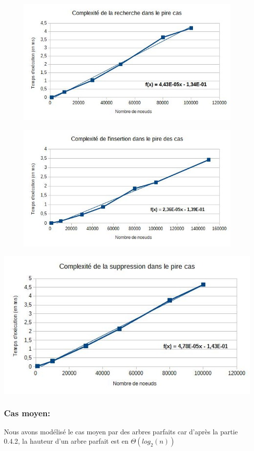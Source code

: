 \documentclass{report}
\begin{document}
\begin{figure}[h]
\includegraphics[scale=0.65]{images/rech.jpg}
\end{figure}
\begin{figure}[h]
\includegraphics[scale=0.65]{images/ins.jpg}
\end{figure}
\includegraphics[scale=0.65]{images/supp.jpg}



\subsubsection{Cas moyen:}
Nous avons modélisé le cas moyen par des arbres parfaits car d'après la partie 0.4.2, la hauteur d'un arbre parfait est en $\Theta(log_2(n))$ 
\end{document}
